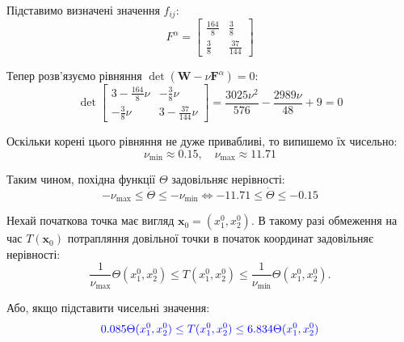 \documentclass{hw_template}
\begin{document}
Підставимо визначені значення $f_{ij}$:
\begin{equation*}
    F^{\alpha} = \begin{bmatrix}
        \frac{164}{8} & \frac{3}{8} \\
        \frac{3}{8} & \frac{37}{144}
    \end{bmatrix}
\end{equation*}

Тепер розв'язуємо рівняння $\det(\boldsymbol{W}-\nu \boldsymbol{F}^{\alpha}) = 0$:
\begin{equation*}
    \det\begin{bmatrix}
        3 - \frac{164}{8}\nu & -\frac{3}{8}\nu \\
        -\frac{3}{8}\nu & 3 - \frac{37}{144}\nu
    \end{bmatrix} = \frac{3025\nu^2}{576} - \frac{2989\nu}{48} + 9 = 0
\end{equation*}

Оскільки корені цього рівняння не дуже привабливі, то випишемо їх чисельно:
\begin{equation*}
    \nu_{\min} \approx 0.15, \quad \nu_{\max} \approx 11.71
\end{equation*}

Таким чином, похідна функції $\Theta$ задовільняє нерівності:
\begin{equation*}
    -\nu_{\max} \leq \dot{\Theta} \leq -\nu_{\min} \iff -11.71 \leq \dot{\Theta} \leq -0.15
\end{equation*}

Нехай початкова точка має вигляд $\mathbf{x}_0 = (x_1^0, x_2^0)$. В такому разі обмеження
на час $T(\mathbf{x}_0)$ потрапляння довільної точки в початок координат задовільняє
нерівності:
\begin{equation*}
    \frac{1}{\nu_{\max}}\Theta(x_1^0, x_2^0) \leq T(x_1^0, x_2^0) \leq \frac{1}{\nu_{\min}}\Theta(x_1^0, x_2^0).
\end{equation*}

Або, якщо підставити чисельні значення:
\begin{equation*}
    \textcolor{blue}{0.085\Theta(x_1^0, x_2^0) \leq T(x_1^0, x_2^0) \leq 6.834\Theta(x_1^0, x_2^0)}
\end{equation*}
\end{document}
